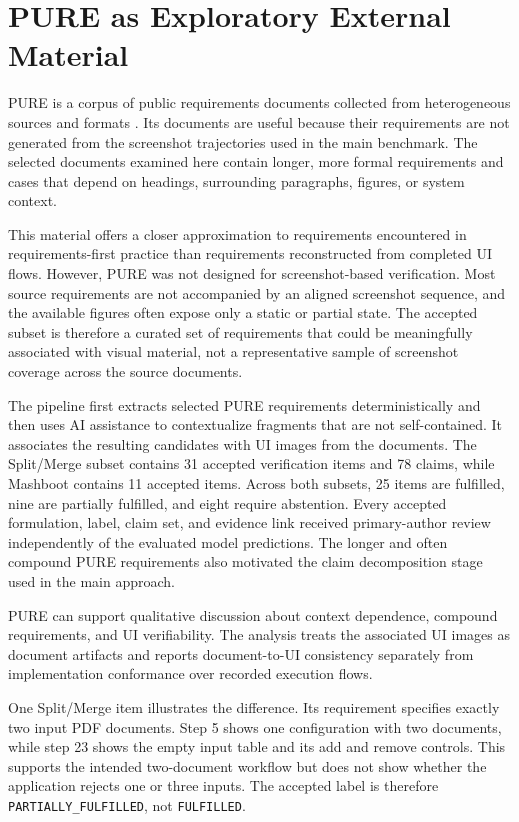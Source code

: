\section{PURE as Exploratory External Material}\label{pure-as-exploratory-external-material}

PURE is a corpus of public requirements documents collected from heterogeneous sources and formats \autocite{ferrari2017}. Its documents are useful because their requirements are not generated from the screenshot trajectories used in the main benchmark. The selected documents examined here contain longer, more formal requirements and cases that depend on headings, surrounding paragraphs, figures, or system context.

This material offers a closer approximation to requirements encountered in
requirements-first practice than requirements reconstructed from completed UI
flows. However, PURE was not designed for screenshot-based verification. Most
source requirements are not accompanied by an aligned screenshot sequence, and
the available figures often expose only a static or partial state. The accepted
subset is therefore a curated set of requirements that could be meaningfully
associated with visual material, not a representative sample of screenshot
coverage across the source documents.

The pipeline first extracts selected PURE requirements deterministically and
then uses AI assistance to contextualize fragments that are not self-contained.
It associates the resulting candidates with UI images from the documents. The
Split/Merge subset contains 31 accepted verification items and 78 claims, while
Mashboot contains 11 accepted items. Across both subsets, 25 items are
fulfilled, nine are partially fulfilled, and eight require abstention. Every
accepted formulation, label, claim set, and evidence link received
primary-author review independently of the evaluated model predictions. The
longer and often compound PURE requirements also motivated the claim
decomposition stage used in the main approach.

PURE can support qualitative discussion about context dependence, compound
requirements, and UI verifiability. The analysis treats the associated UI
images as document artifacts and reports document-to-UI consistency separately
from implementation conformance over recorded execution flows.

One Split/Merge item illustrates the difference. Its requirement specifies
exactly two input PDF documents. Step 5 shows one configuration with two
documents, while step 23 shows the empty input table and its add and remove
controls. This supports the intended two-document workflow but does not show
whether the application rejects one or three inputs. The accepted label is
therefore \texttt{PARTIALLY\_\allowbreak FULFILLED}, not \texttt{FULFILLED}.

